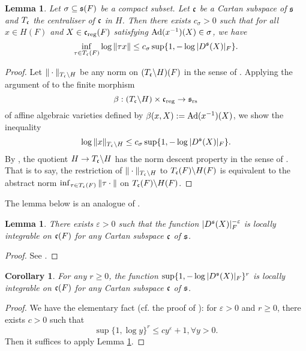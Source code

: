 \documentclass[a4paper]{amsart}
\newtheorem{coro}[thm]{Corollary}
\newtheorem{lem}[thm]{Lemma}
\theoremstyle{definition}
\theoremstyle{remark}
\numberwithin{equation}{subsection}
\begin{document}
\begin{lem}\label{lemIII.4}
Let $\sigma\subseteq {\mathfrak{s}}(F)$ be a compact subset. Let ${\mathfrak{c}}$ be a Cartan subspace of ${\mathfrak{s}}$ and $T_{\mathfrak{c}}$ the centraliser of ${\mathfrak{c}}$ in $H$. Then there exists $c_\sigma>0$ such that for all $x\in H(F)$ and $X\in{\mathfrak{c}}_{\mathrm{reg}}(F)$ satisfying ${\mathrm{Ad}}(x^{-1})(X)\in\sigma$, we have
$$ \inf_{\tau\in T_{\mathfrak{c}}(F)} \log\|\tau x\| \leq c_\sigma\sup\{1, -\log |D^{\mathfrak{s}}(X)|_F\}. $$
\end{lem}

\begin{proof}
Let $\|\cdot\|_{T_{\mathfrak{c}}\backslash H}$ be any norm on $(T_{\mathfrak{c}}\backslash H)(F)$ in the sense of \cite[\S18.2]{MR2192014}. Applying the argument of \cite[Lemma 20.3]{MR2192014} to the finite morphism
$$ \beta: (T_{\mathfrak{c}}\backslash H)\times{\mathfrak{c}}_{\mathrm{reg}}\rightarrow{\mathfrak{s}}_{\mathrm{rs}} $$
of affine algebraic varieties defined by $\beta(x,X):={\mathrm{Ad}}(x^{-1})(X)$, we show the inequality
$$ \log\|x\|_{T_{\mathfrak{c}}\backslash H}\leq c_\sigma\sup\{1, -\log |D^{\mathfrak{s}}(X)|_F\}. $$
By \cite[Proposition 18.3]{MR2192014}, the quotient $H\rightarrow T_{\mathfrak{c}}\backslash H$ has the norm descent property in the sense of \cite[\S18.6]{MR2192014}. That is to say, the restriction of $\|\cdot\|_{T_{\mathfrak{c}}\backslash H}$ to $T_{\mathfrak{c}}(F)\backslash H(F)$ is equivalent to the abstract norm $\inf_{\tau\in T_{\mathfrak{c}}(F)} \|\tau \cdot\|$ on $T_{\mathfrak{c}}(F)\backslash H(F)$. 
\end{proof} 

The lemma below is an analogue of \cite[Lemma 44]{MR0414797}. 

\begin{lem}\label{lem44}
There exists $\varepsilon>0$ such that the function $|D^{\mathfrak{s}}(X)|_F^{-\varepsilon}$ is locally integrable on ${\mathfrak{c}}(F)$ for any Cartan subspace ${\mathfrak{c}}$ of ${\mathfrak{s}}$. 
\end{lem}

\begin{proof}
See \cite[Lemma 4.3]{MR3245011}. 
\end{proof}

\begin{coro}\label{cor20.2}
For any $r\geq0$, the function $\sup\{1, -\log |D^{\mathfrak{s}}(X)|_F\}^r$ is locally integrable on ${\mathfrak{c}}(F)$ for any Cartan subspace ${\mathfrak{c}}$ of ${\mathfrak{s}}$.
\end{coro}

\begin{proof}
We have the elementary fact (cf. the proof of \cite[Corollary 20.2]{MR2192014}): for $\varepsilon>0$ and $r\geq0$, there exists $c>0$ such that
$$ \sup\{1, \log y\}^r\leq cy^\varepsilon+1,\forall y>0. $$
Then it suffices to apply Lemma \ref{lem44}. 
\end{proof}
\end{document}
